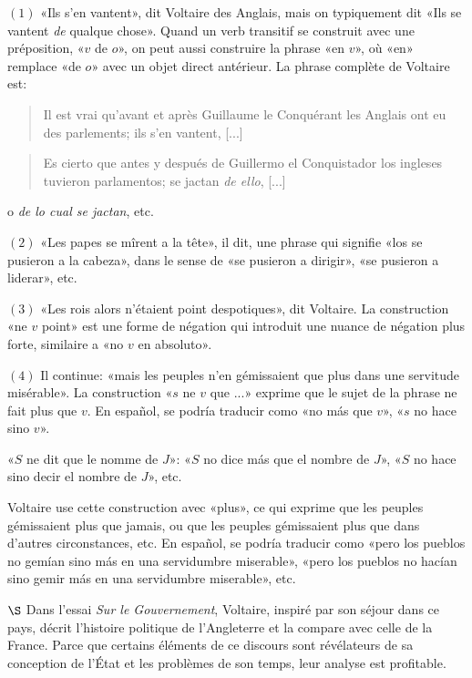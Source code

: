 \documentclass[a4paper, 12pt]{article}
\begin{document}
$(1)$ «Ils s'en vantent», dit Voltaire des Anglais, mais on typiquement dit «Ils
se vantent \textit{de} qualque chose». Quand un verb transitif se construit avec
une préposition, «$v$ de $o$», on peut aussi construire la phrase «en $v$», où
«en» remplace «de $o$» avec un objet direct antérieur. La phrase complète de
Voltaire est: 

\begin{quote}
Il est vrai qu'avant et après Guillaume le Conquérant les Anglais ont eu des
parlements; ils s'en vantent, [...]
\end{quote}

\begin{quote}
    Es cierto que antes y después de Guillermo el Conquistador los ingleses
    tuvieron parlamentos; se jactan \textit{de ello}, [...]
\end{quote}

o \textit{de lo cual se jactan}, etc.

$(2)$ «Les papes se mîrent a la tête», il dit, une phrase qui signifie 
«los se pusieron a la cabeza», dans le sense de «se pusieron a dirigir», «se
pusieron a liderar», etc. 

$(3)$ «Les rois alors n'étaient point despotiques», dit Voltaire. La
construction «ne $v$ point» est une forme de négation qui introduit une nuance
de négation plus forte, similaire a «no $v$ en absoluto».

$(4)$ Il continue: «mais les peuples n'en gémissaient que plus dans une servitude
misérable». La construction «$s$ ne $v$ que ...» exprime que le sujet de la phrase
ne fait plus que $v$. En español, se podría traducir como «no más que $v$», «$s$
no hace sino $v$». 

«$S$ ne dit que le nomme de $J$»: «$S$ no dice más que el nombre de $J$», «$S$
no hace sino decir el nombre de $J$», etc.

Voltaire use cette construction avec «plus», ce qui exprime que les peuples
gémissaient plus que jamais, ou que les peuples gémissaient plus que dans
d'autres circonstances, etc. En español, se podría traducir como «pero los
pueblos no gemían sino más en una servidumbre miserable», «pero los pueblos no
hacían sino gemir más en una servidumbre miserable», etc.

\pagebreak 

$\S$ Dans l'essai \textit{Sur le Gouvernement}, Voltaire, inspiré par son séjour
dans ce pays, décrit l'histoire politique de l'Angleterre et la compare avec
celle de la France. Parce que certains éléments de ce discours sont révélateurs
de sa conception de l'État et les problèmes de son temps, leur analyse est
profitable.
\end{document}
